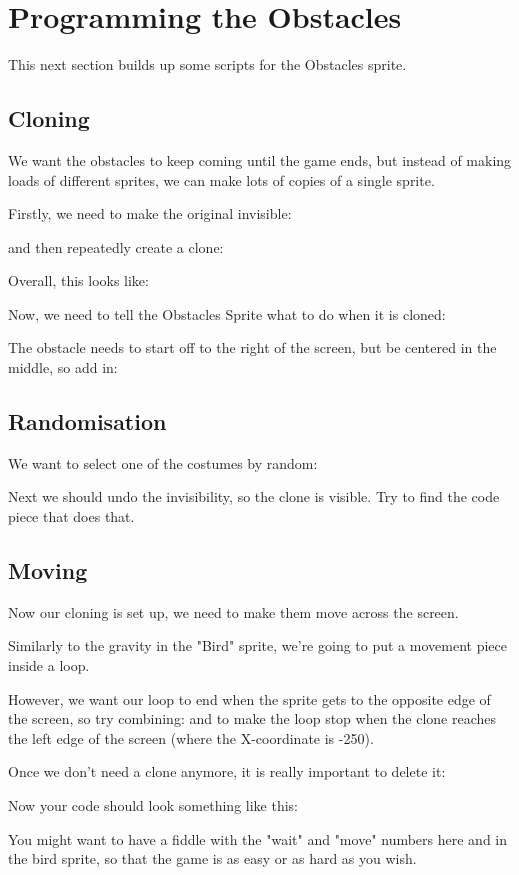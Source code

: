 \section{Programming the Obstacles}
This next section builds up some scripts for the Obstacles sprite.

\subsection{Cloning}
We want the obstacles to keep coming until the game ends, but instead of making loads of different sprites, we can make lots of copies of a single sprite.

\vfill

Firstly, we need to make the original invisible:

and then repeatedly create a clone:

Overall, this looks like:

\vfill



Now, we need to tell the Obstacles Sprite what to do when it is cloned:

The obstacle needs to start off to the right of the screen, but be centered in the middle, so add in:


\subsection{Randomisation}
We want to select one of the costumes by random:


Next we should undo the invisibility, so the clone is visible. Try to find the code piece that does that.


\subsection{Moving}
Now our cloning is set up, we need to make them move across the screen.

\vfill

Similarly to the gravity in the "Bird" sprite, we're going to put a movement piece inside a loop.

However, we want our loop to end when the sprite gets to the opposite edge of the screen, so try combining:
and
to make the loop stop when the clone reaches the left edge of the screen (where the X-coordinate is -250).

Once we don't need a clone anymore, it is really important to delete it:


\vfill

Now your code should look something like this:

\vfill

You might want to have a fiddle with the "wait" and "move" numbers here and in the bird sprite, so that the game is as easy or as hard as you wish.